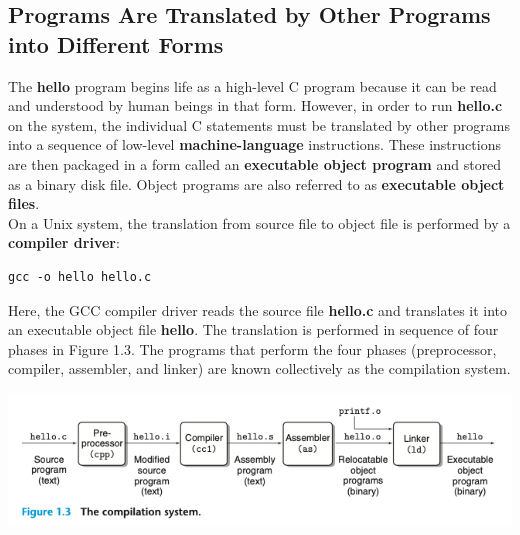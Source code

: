 \documentclass[11pt]{article}
\begin{document}
\subsection{Programs Are Translated by Other Programs into Different Forms}
\label{sec:org2ea9626}
The \textbf{hello} program begins life as a high-level C program because it can be read and understood by human beings in that form. However, in order to run \textbf{hello.c} on the system, the individual C statements must be translated by other programs into a sequence of low-level \textbf{machine-language} instructions. These instructions are then packaged in a form called an \textbf{executable object program} and stored as a binary disk file. Object programs are also referred to as \textbf{executable object files}.\\

On a Unix system, the translation from source file to object file is performed by a \textbf{compiler driver}:\\

\begin{verbatim}
gcc -o hello hello.c
\end{verbatim}

Here, the GCC compiler driver reads the source file \textbf{hello.c} and translates it into an executable object file \textbf{hello}. The translation is performed in sequence of four phases in Figure 1.3. The programs that perform the four phases (preprocessor, compiler, assembler, and linker) are known collectively as the compilation system.\\

\begin{center}
\includegraphics[width=.9\linewidth]{pics/compilation-system.png}
\end{center}
\end{document}
